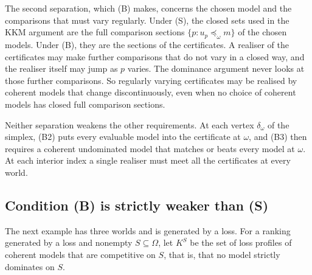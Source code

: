 \documentclass[11pt]{article}
\theoremstyle{definition}
\theoremstyle{remark}
\begin{document}
The second separation, which (B) makes, concerns the chosen model and the comparisons that must vary regularly. Under (S), the closed sets used in the KKM argument are the full comparison sections $\{p:u_p\preceq_\omega m\}$ of the chosen models. Under (B), they are the sections of the certificates. A realiser of the certificates may make further comparisons that do not vary in a closed way, and the realiser itself may jump as $p$ varies. The dominance argument never looks at those further comparisons. So regularly varying certificates may be realised by coherent models that change discontinuously, even when no choice of coherent models has closed full comparison sections.

Neither separation weakens the other requirements. At each vertex $\delta_\omega$ of the simplex, (B2) puts every evaluable model into the certificate at $\omega$, and (B3) then requires a coherent undominated model that matches or beats every model at $\omega$. At each interior index a single realiser must meet all the certificates at every world.

\subsection{Condition (B) is strictly weaker than (S)}\label{sec:strict-weakening}
The next example has three worlds and is generated by a loss. For a ranking generated by a loss and nonempty $S\subseteq\Omega$, let $K^S$ be the set of loss profiles of coherent models that are competitive on $S$, that is, that no model strictly dominates on $S$.
\end{document}

